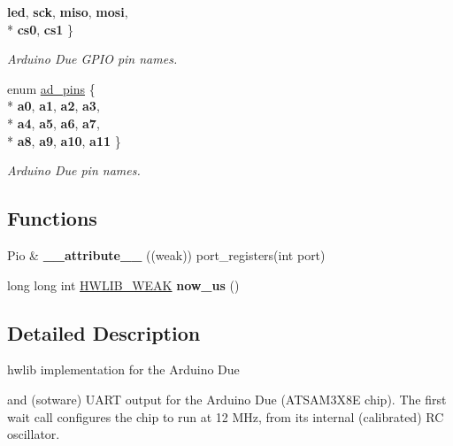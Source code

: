 \begin{DoxyCompactItemize}
{\bfseries led}, 
{\bfseries sck}, 
{\bfseries miso}, 
{\bfseries mosi}, 
\\*
{\bfseries cs0}, 
{\bfseries cs1}
 \}\begin{DoxyCompactList}\small\item\em Arduino Due G\+P\+IO pin names. \end{DoxyCompactList}
\item 
enum \hyperlink{namespacedue_a5ecc98d40585c91eabbfb14f71bd7d4c}{ad\+\_\+pins} \{ \\*
{\bfseries a0}, 
{\bfseries a1}, 
{\bfseries a2}, 
{\bfseries a3}, 
\\*
{\bfseries a4}, 
{\bfseries a5}, 
{\bfseries a6}, 
{\bfseries a7}, 
\\*
{\bfseries a8}, 
{\bfseries a9}, 
{\bfseries a10}, 
{\bfseries a11}
 \}\begin{DoxyCompactList}\small\item\em Arduino Due pin names. \end{DoxyCompactList}
\end{DoxyCompactItemize}
\subsection*{Functions}
\begin{DoxyCompactItemize}
\item 
Pio \& {\bfseries \+\_\+\+\_\+attribute\+\_\+\+\_\+} ((weak)) port\+\_\+registers(int port)\hypertarget{namespacedue_a691468d1eaea9eb36a06b94e7c27d6fa}{}\label{namespacedue_a691468d1eaea9eb36a06b94e7c27d6fa}

\item 
long long int \hyperlink{hwlib-defines_8hpp_a04be4340016df60d6636c1d1c6d94fc9}{H\+W\+L\+I\+B\+\_\+\+W\+E\+AK} {\bfseries now\+\_\+us} ()\hypertarget{namespacedue_a763b16adccc73515e1d463402e05fd52}{}\label{namespacedue_a763b16adccc73515e1d463402e05fd52}

\end{DoxyCompactItemize}


\subsection{Detailed Description}
hwlib implementation for the Arduino Due 

 and (sotware) U\+A\+RT output for the Arduino Due (A\+T\+S\+A\+M3\+X8E chip). The first wait call configures the chip to run at 12 M\+Hz, from its internal (calibrated) RC oscillator.

